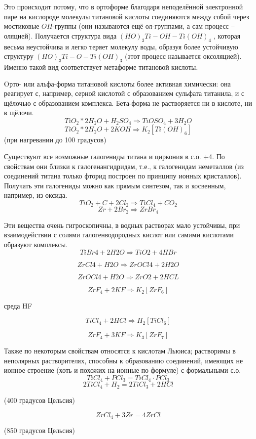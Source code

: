 \documentclass[11pt]{article}
\begin{document}
Это происходит потому, что в ортоформе благодаря неподелённой электронной
паре на кислороде молекулы титановой кислоты соединяются между собой через
мостиковые $OH$-группы (они называются ещё ол-группами, а сам процесс – оляцией).
Получается структура вида $(HO)_3 Ti-OH-Ti(OH)_4$ , которая весьма неустойчива и легко теряет
молекулу воды, образуя более устойчивую структуру $(HO)_3 Ti-O-Ti(OH) _3$ (этот процесс
называется оксоляцией).
 Именно такой вид соответствует метаформе титановой кислоты.

Oрто- или альфа-форма титановой кислоты более активная химически: она реагирует с,
например, серной кислотой с образованием сульфата титанила, и с щёлочью с
образованием комплекса. Бета-форма не растворяется ни в кислоте, ни в щёлочи.
$$TiO _2 *2H _2 O + H _2 SO _4 \Rightarrow TiOSO _4 + 3H _2 O$$
$$TiO _2 *2H _2 O + 2KOH \Rightarrow K _2 [Ti(OH) _6 ]$$ (при нагревании до 100 градусов)

Существуют все возможные галогениды титана и циркония в с.о. +4. По свойствам они
близки к галогенангидридам, т.е., к галогенидам неметаллов (из соединений титана
только фторид построен по принципу ионных кристаллов). Получать эти галогениды
можно как прямым синтезом, так и косвенным, например, из оксида.
$$TiO _2 + C + 2Cl _2 \Rightarrow TiCl _4 + CO _2$$
$$Zr + 2Br _2 \Rightarrow ZrBr _4$$

Эти вещества очень гигроскопичны, в водных растворах мало устойчивы, при
взаимодействии с солями галогенводородных кислот или самими кислотами образуют
комплексы.
$$TiBr 4 + 2H 2 O \Rightarrow TiO 2 + 4HBr$$

$$ZrCl 4 + H 2 O \Rightarrow ZrOCl 4 + 2H 2 O$$

$$ZrOCl 4 + H 2 O \Rightarrow ZrO 2 + 2HCL$$

$$ZrF _4 + 2KF \Rightarrow K _2 [ZrF _6 ]$$ \begin{center}среда HF\end{center}

$$TiCl _4 + 2HCl \Rightarrow H _2 [TiCl _6 ]$$

$$ZrF _4 + 3KF \Rightarrow K _3 [ZrF _7 ]$$

Также по некоторым свойствам относятся к кислотам Льюиса; растворимы в неполярных
растворителях, способны к образованию соединений, имеющих не ионное строение (хоть
и похожих на ионные по формуле) с формальными с.о.
$$TiCl _4 + PCl _3 = TiCl _4 \cdot PCl _3$$
$$2TiCl _4 + H _2 = 2TiCl _3 + 2HCl$$ \begin{center}(400 градусов Цельсия)\end{center}
$$ZrCl _4 + 3Zr = 4ZrCl$$ \begin{center}(850 градусов Цельсия)\end{center}
\end{document}
